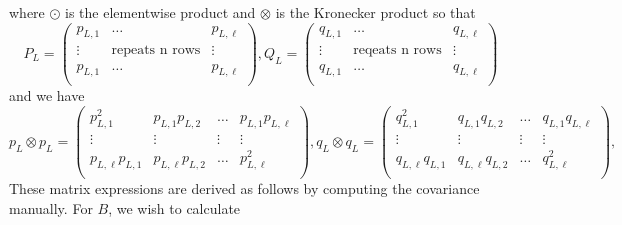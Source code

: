 \documentclass{statsmsc}
\begin{document}
where $\odot$ is the elementwise product and $\otimes$ is the Kronecker product so that 
$$
P_L=\begin{pmatrix}
  p_{L,1}  & \dots & p_{L,\ell}  \\
  \vdots & \text{repeats n rows} &  \vdots\\
  p_{L,1}  & \dots & p_{L,\ell}  \\
\end{pmatrix},
Q_L=\begin{pmatrix}
  q_{L,1}  & \dots & q_{L,\ell}  \\
  \vdots & \text{reqeats n rows} &  \vdots\\
  q_{L,1}  & \dots & q_{L,\ell}  \\
\end{pmatrix}
$$
and we have 
$$
p_L\otimes p_L=\begin{pmatrix}
  p_{L,1}^2 & p_{L,1}p_{L,2} & \dots & p_{L,1}p_{L,\ell} \\
  \vdots & \vdots & \vdots & \vdots \\
  p_{L,\ell}p_{L,1} & p_{L,\ell}p_{L,2} & \dots & p_{L,\ell}^2 \\
\end{pmatrix},
q_L\otimes q_L=\begin{pmatrix}
  q_{L,1}^2 & q_{L,1}q_{L,2} & \dots & q_{L,1}q_{L,\ell} \\
  \vdots & \vdots & \vdots & \vdots \\
  q_{L,\ell}q_{L,1} & q_{L,\ell}q_{L,2} & \dots & q_{L,\ell}^2 \\
\end{pmatrix},
$$ 
These matrix expressions are derived as follows by computing the covariance manually. 
For $B$, we wish to calculate 
\end{document}
